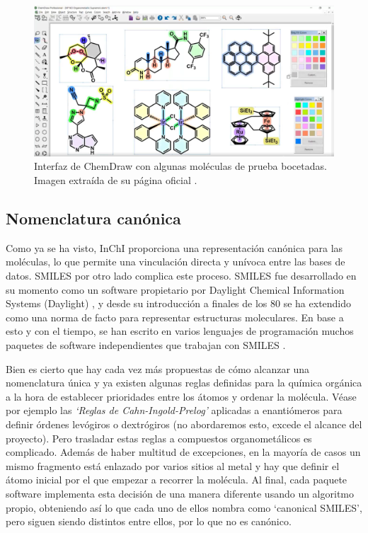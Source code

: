 \begin{figure}[h!]
    \centering
    \includegraphics[scale=0.34]{imagenes/estado_arte/chemdraw.png}
    \caption{Interfaz de ChemDraw con algunas moléculas de prueba bocetadas. Imagen extraída de su página oficial \cite{chemdraw_page}.}
    \label{fig:chemdraw}
\end{figure}

\subsection{Nomenclatura canónica} \label{estado:canon}
Como ya se ha visto, InChI proporciona una representación canónica para las moléculas, lo que permite una vinculación directa y unívoca entre las bases de datos. SMILES por otro lado complica este proceso. SMILES fue desarrollado en su momento como un software propietario por Daylight Chemical Information Systems (Daylight) \cite{daylight}, y desde su introducción a finales de los 80 se ha extendido como una norma de facto para representar estructuras moleculares. En base a esto y con el tiempo, se han escrito en varios lenguajes de programación muchos paquetes de software independientes que trabajan con SMILES \cite{opensmiles}.

Bien es cierto que hay cada vez más propuestas de cómo alcanzar una nomenclatura única \cite{weininger_smiles_1989, inchi1, nextmove_software_facto_nodate, baoilleach_we_nodate, universal_smiles} y ya existen algunas reglas definidas para la química orgánica a la hora de establecer prioridades entre los átomos y ordenar la molécula. Véase por ejemplo las \emph{`Reglas de Cahn-Ingold-Prelog'} aplicadas a enantiómeros \cite{cahn_specification_1966, prelog_basic_1982, NOMENCLATURA_R_S} para definir órdenes levógiros o dextrógiros (no abordaremos esto, excede el alcance del proyecto). Pero trasladar estas reglas a compuestos organometálicos es complicado. Además de haber multitud de excepciones, en la mayoría de casos un mismo fragmento está enlazado por varios sitios al metal y hay que definir el átomo inicial por el que empezar a recorrer la molécula. Al final, cada paquete software implementa esta decisión de una manera diferente usando un algoritmo propio, obteniendo así lo que cada uno de ellos nombra como `canonical SMILES', pero siguen siendo distintos entre ellos, por lo que no es canónico.

